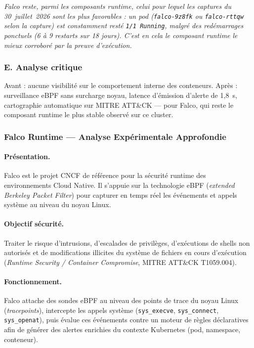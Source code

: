 \textit{Falco reste, parmi les composants runtime, celui pour lequel les captures du 30~juillet~2026 sont les plus favorables : un pod (\texttt{falco-9z8fk} ou \texttt{falco-rttqw} selon la capture) est constamment resté \texttt{1/1 Running}, malgré des redémarrages ponctuels (6 à 9 restarts sur 18 jours). C'est en cela le composant runtime le mieux corroboré par la preuve d'exécution.}

\subsubsection{E. Analyse critique}
Avant : aucune visibilité sur le comportement interne des conteneurs. Après : surveillance eBPF sans surcharge noyau, latence d'émission d'alerte de 1,8~s, cartographie automatique sur MITRE ATT\&CK — pour Falco, qui reste le composant runtime le plus stable observé sur ce cluster.

\subsubsection{Falco Runtime — Analyse Expérimentale Approfondie}

\paragraph{Présentation.}
Falco est le projet CNCF de référence pour la sécurité runtime des environnements Cloud Native. Il s'appuie sur la technologie eBPF (\textit{extended Berkeley Packet Filter}) pour capturer en temps réel les événements et appels système au niveau du noyau Linux.

\paragraph{Objectif sécurité.}
Traiter le risque d'intrusions, d'escalades de privilèges, d'exécutions de shells non autorisés et de modifications illicites du système de fichiers en cours d'exécution (\textit{Runtime Security / Container Compromise}, MITRE ATT\&CK T1059.004).

\paragraph{Fonctionnement.}
Falco attache des sondes eBPF au niveau des points de trace du noyau Linux (\textit{tracepoints}), intercepte les appels système (\texttt{sys\_execve}, \texttt{sys\_connect}, \texttt{sys\_openat}), puis évalue ces événements contre un moteur de règles déclaratives afin de générer des alertes enrichies du contexte Kubernetes (pod, namespace, conteneur).

